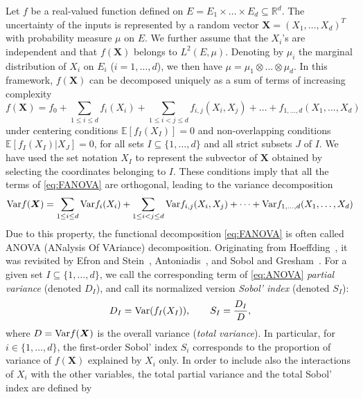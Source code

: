 \documentclass[a4paper,11pt]{article}
\newcommand{\ve}[1]{\boldsymbol{#1}}
\newcommand{\Var}{{\rm Var}}
\newcommand{\Esp}[1]{{\mathbb E}\left[ #1 \right]}
\renewcommand{\citet}[2][]{\cite[#1]{#2}}
\theoremstyle{definition}
\theoremstyle{remark}
\theoremstyle{theorem}
\begin{document}
Let $f$ be a real-valued function defined on $E = E_1 \times \dots \times E_d \subseteq \mathbb{R}^d$. The uncertainty of the inputs is represented by a random vector $\ve X = (X_1, \dots, X_d)^T$ with probability measure $\mu$ on $E$. We further assume that the $X_i$'s are independent and that $f(\ve X)$ belongs to $L^2(E, \mu)$. Denoting by $\mu_i$ the marginal distribution of $X_i$ on $E_i$ ($i=1, \dots, d$), we then have $\mu = \mu_1 \otimes \dots \otimes \mu_d$.
In this framework, $f(\ve X)$ can be decomposed uniquely as a sum of terms of increasing complexity
\begin{equation} \label{eq:FANOVA}
f(\ve X) = f_0 + \sum_{1 \leq i \leq d} f_i(X_i) + \sum_{1 \leq i <j \leq d} f_{i,j}(X_i, X_j) %
+ \dots + f_{1, \dots, d}(X_1, \dots, X_d)
\end{equation}
under centering conditions $\Esp{f_I(X_I)} = 0$ and non-overlapping conditions $\Esp{f_I(X_I) \vert X_J} =0$, for all sets $I \subseteq \{1, \dots, d \}$ and all strict subsets $J$ of $I$. We have used the set notation $X_I$ to represent the subvector of $\ve X$ obtained by selecting the coordinates belonging to $I$. These conditions imply that all the terms of \eqref{eq:FANOVA} are orthogonal, leading to the variance decomposition
\begin{equation} \label{eq:ANOVA}
\Var{f(\ve X)} = \sum_{1 \leq i \leq d} \Var{f_i(X_i)} + \sum_{1 \leq i <j \leq d} \Var{f_{i,j}(X_i, X_j)} 
+ \dots + 
\Var{f_{1, \dots, d}(X_1, \dots, X_d)}
\end{equation}
Due to this property, the functional decomposition \eqref{eq:FANOVA} is often called ANOVA (ANalysis Of VAriance) decomposition. Originating from Hoeffding~\citet{Hoeffding_1948}, it was revisited by Efron and Stein~\citet{efrste81}, Antoniadis~\citet{Antoniadis1984}, and Sobol and Gresham~\citet{sob93}. 
For a given set $I \subseteq \{1, \dots, d\}$, we call the corresponding term of \eqref{eq:ANOVA} \textit{partial variance} (denoted $D_I$), and call its normalized version \textit{Sobol' index} (denoted $S_I$):
\begin{equation*}
D_I = \Var(f_I(X_I)), \qquad S_I = \frac{D_I}{D},
\end{equation*}
where $D = \Var{f(\ve X)}$ is the overall variance (\textit{total variance}). 
In particular, for $i \in \{1, \dots, d\}$, the first-order Sobol' index $S_i$  corresponds to the proportion of variance of $f(\ve X)$ explained by $X_i$ only. In order to include also the interactions of $X_i$ with the other variables, the total partial variance and the total Sobol' index are defined by
\end{document}

